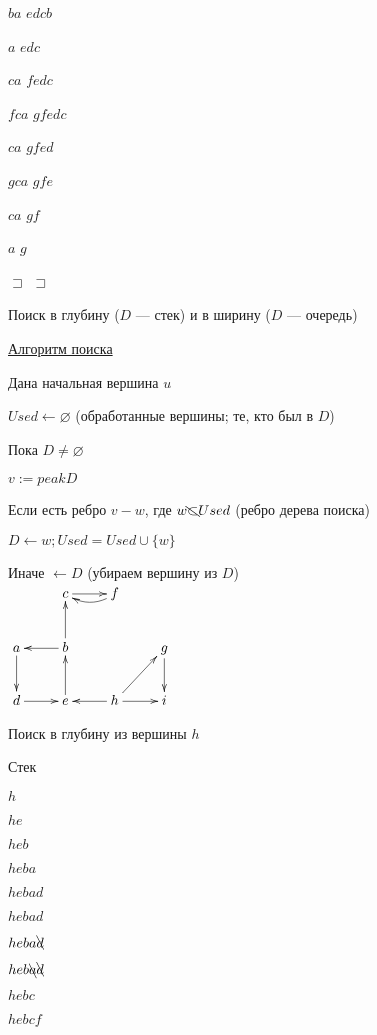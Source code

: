 \documentclass[a4paper, 12pt] {article}
\begin{document}
$ ba $ \hfill $ edcb $

$ a $ \hfill $ edc $

$ ca $ \hfill $ fedc $

$ fca $ \hfill $ gfedc $

$ ca $ \hfill $ gfed $

$ gca $ \hfill $ gfe $

$ ca $ \hfill $ gf $

$ a $ \hfill $ g $

$ \sqsupset $ \hfill $ \sqsupset $
\\

\begin{center}
	Поиск в глубину ($ D $ --- стек) и в ширину ($ D $ --- очередь)
\end{center}

\underline{Алгоритм поиска}

Дана начальная вершина $ u $

$ Used \leftarrow \varnothing $ (обработанные вершины; те, кто был в $ D $)

Пока $ D \ne \varnothing $

$ v := peak D $

Если есть ребро $ v-w $, где $ w \bcancel \subset Used $ (ребро дерева поиска)

$ D \leftarrow w; Used=Used \cup \{w\} $

Иначе $  \leftarrow D $ (убираем вершину из $ D $)
\\
$ 
\begin{matrix}
	\xymatrix{
		& c \ar@{->}[r] & f \ar@/^/[l]\\
		a \ar@{->}[d] & b \ar@{->}[l] \ar@{->}[u] & & g \ar@{->}[d] \\
		d \ar@{->}[r] & e \ar@{->}[u] & h \ar@{->}[r] \ar@{->}[l] \ar@{->}[ru] & i
	}
\end{matrix} $

\newpage

Поиск в глубину из вершины $ h $

Стек

$ h $

$ he $

$ heb $

$ heba $

$ hebad $

$ hebad $

$ heba \bcancel d $

$ heb \bcancel a \bcancel d $

$ hebc $

$ hebcf $
\end{document}

